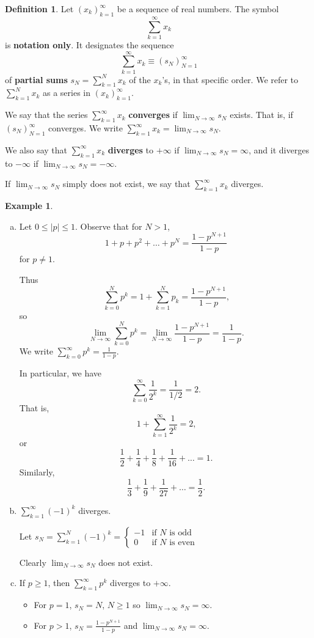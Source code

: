 \documentclass[11pt]{article}
\theoremstyle{definition}
\newtheorem{defn}[thm]{Definition}
\newtheorem{exmp}[thm]{Example}
\begin{document}
\begin{defn}
Let $(x_k)_{k=1}^\infty$ be a sequence of real numbers. The symbol
$$\sum_{k=1}^\infty x_k$$
is \textbf{notation only}. It designates the sequence
$$\sum_{k=1}^\infty x_k \equiv (s_N)_{N=1}^\infty$$
of \textbf{partial sums} $s_N = \sum_{k=1}^N x_k$ of the $x_k$'s, in that specific order. We refer to $\sum_{k=1}^N x_k$ as a series in $(x_k)_{k=1}^\infty$. 

We say that the series $\sum_{k=1}^\infty x_k$ \textbf{converges} if $\lim_{N\to\infty} s_N$ exists. That is, if $(s_N)_{N=1}^\infty$ converges. We write $\sum_{k=1}^\infty x_k = \lim_{N\to\infty} s_N$. 

We also say that $\sum_{k=1}^\infty x_k$ \textbf{diverges} to $+\infty$ if $\lim_{N\to\infty} s_N = \infty$, and it diverges to $-\infty$ if $\lim_{N\to\infty} s_N = -\infty$.

If $\lim_{N\to\infty} s_N$ simply does not exist, we say that $\sum_{k=1}^\infty x_k$ diverges.
\end{defn}

\begin{exmp}~
\begin{enumerate}[(a)]

\item Let $0 \leq |p| \leq 1$. Observe that for $N > 1$,
$$1 + p + p^2 + \dots + p^N = \frac{1 - p^{N+1}}{1-p}$$
for $p \ne 1$.

Thus $$\sum_{k=0}^N p^k = 1 + \sum_{k=1}^N p_k = \dfrac{1 - p^{N+1}}{1-p} \text{,}$$
so $$\lim_{N\to\infty} \sum_{k=0}^N p^k = \lim_{N\to\infty} \frac{1-p^{N+1}}{1-p} = \frac{1}{1-p} \text{.}$$
We write $\sum_{k=0}^\infty p^k = \frac{1}{1-p}$.

In particular, we have
$$\sum_{k=0}^\infty \frac1{2^k} = \frac{1}{1/2} = 2 \text{.}$$
That is,
$$1 + \sum_{k=1}^\infty \frac1{2^k} = 2 \text{,}$$
or
$$\frac12 + \frac14 + \frac18 + \frac1{16} + \dots = 1 \text{.}$$
Similarly,
$$\frac13 + \frac19 + \frac1{27} + \dots = \frac12 \text{.}$$

\item $\sum_{k=1}^\infty (-1)^k$ diverges. 

Let $s_N = \sum_{k=1}^N (-1)^k = \begin{cases} -1 & \text{if $N$ is odd} \\ 0 & \text{if $N$ is even} \end{cases}$

Clearly $\lim_{N\to\infty} s_N$ does not exist.

\item If $p \geq 1$, then $\sum_{k=1}^\infty p^k$ diverges to $+\infty$.
\begin{itemize}
\item For $p = 1$, $s_N = N$, $N \geq 1$ so $\lim_{N\to\infty} s_N = \infty$.
\item For $p > 1$, $s_N = \frac{1-p^{N+1}}{1-p}$ and $\lim_{N\to\infty} s_N = \infty$.
\end{itemize}
\end{enumerate}
\end{exmp}
\end{document}
